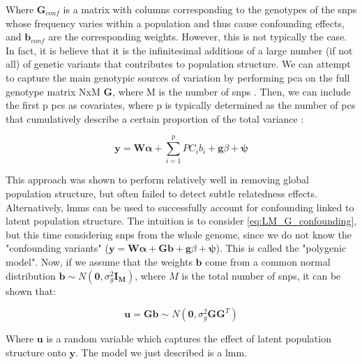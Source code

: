 Where $\mathbf{G}_{conf}$ is a matrix with columns corresponding to the genotypes of the \gls{snp}s whose frequency varies within a population and thus cause confounding effects, and $\mathbf{b}_{conf}$ are the corresponding weights. 
However, this is not typically the case.
In fact, it is believe that it is the infinitesimal additions of a large number (if not all) of genetic variants that contributes to population structure.
We can attempt to capture the main genotypic sources of variation by performing \gls{pca} on the full genotype matrix NxM $\mathbf{G}$, where M is the number of \gls{snp}s \cite{price2006principal}.
Then, we can include the first p \gls{pc}s as covariates, where p is typically determined as the number of \gls{pc}s that cumulatively describe a certain proportion of the total variance \cite{price2006principal}:

\begin{equation}\label{eq:LM_PC_confounding}
    \mathbf{y} =  \mathbf{W}\boldsymbol{\alpha} + \sum_{i=1}^{p} PC_i b_i + \mathbf{g}\beta + \boldsymbol{\psi} 
\end{equation}

This approach was shown to perform relatively well in removing global population structure, but often failed to detect subtle relatedness effects.\\

Alternatively, \gls{lmm}s can be used to successfully account for confounding linked to latent population structure.
The intuition is to consider \eqref{eq:LM_G_confounding}, but this time considering \gls{snp}s from the whole genome, since we do not know the "confounding variants" ($\mathbf{y} =  \mathbf{W}\boldsymbol{\alpha} +  \mathbf{G}\mathbf{b} + \mathbf{g}\beta + \boldsymbol{\psi}$).
This is called the "polygenic model".
Now, if we assume that the weights $\mathbf{b}$ come from a common normal distribution $\mathbf{b} \sim N(\mathbf{0},\sigma^2_g\mathbf{I_M})$, where $M$ is the total number of \gls{snps}, it can be shown that:

\begin{equation}\label{eq:LMM_u_confounding}
    \mathbf{u} =  \mathbf{G}\mathbf{b} \sim N(\mathbf{0},\sigma^2_g \mathbf{G}\mathbf{G}^T)
\end{equation}

Where $\mathbf{u}$ is a random variable which captures the effect of latent population structure onto $\mathbf{y}$.
The model we just described is a \gls{lmm}.\\

